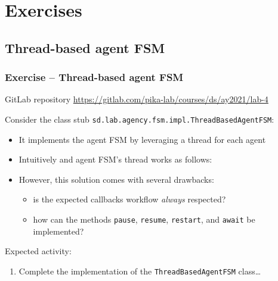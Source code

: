 \documentclass[presentation]{beamer}\mode<presentation>{\usetheme{AMSCesenaPurpleAndGold}}
\newcommand{\labN}{4}
\newcommand{\labGroup}{https://gitlab.com/pika-lab/courses/ds/ay2021}
\newcommand{\labRepo}{\labGroup/lab-\labN}
\begin{document}
\section{Exercises}

\startExercise

\subsection{Thread-based agent FSM}

\begin{frame}[c, allowframebreaks]
    \frametitle{Exercise \currentExercise{} -- Thread-based agent FSM}

    \begin{block}{GitLab repository}\centering
        \url{\labRepo}
    \end{block}

    \bigskip

    Consider the class stub \texttt{sd.lab.agency.fsm.impl.\alert{ThreadBasedAgentFSM}}:
    \bigskip
    \begin{itemize}
        \item It implements the agent FSM by leveraging a thread for each agent

        \framebreak

        \item Intuitively and agent FSM's thread works as follows:
        

        \item However, this solution comes with several drawbacks:
        \begin{itemize}
            \item is the expected callbacks workflow \emph{always} respected?
            \item how can the methods \texttt{pause}, \texttt{resume}, \texttt{restart}, and \texttt{await} be implemented?
        \end{itemize}

    \end{itemize}

    \framebreak

    Expected activity:
    \bigskip
    \begin{enumerate}

        \item Complete the implementation of the \texttt{ThreadBasedAgentFSM} class\ldots


\end{enumerate}
\end{frame}
\end{document}
